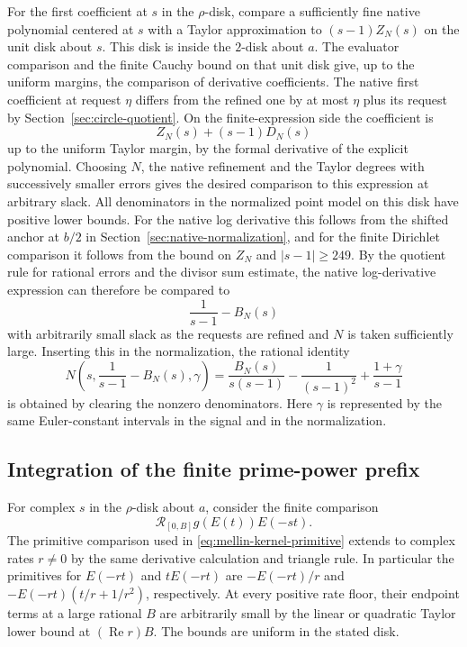 \documentclass[11pt]{amsart}
\theoremstyle{definition}
\theoremstyle{remark}
\numberwithin{equation}{section}
\newcommand{\re}{\operatorname{Re}}
\begin{document}
For the first coefficient at \(s\) in the \(\rho\)-disk,
compare a sufficiently fine native polynomial centered
at \(s\) with a Taylor approximation to
\((s-1)Z_N(s)\) on the unit disk about \(s\).
This disk is inside the \(2\)-disk about \(a\).
The evaluator comparison and the finite Cauchy bound on
that unit disk give, up to the uniform margins, the
comparison of derivative coefficients.
The native first coefficient at request \(\eta\) differs
from the refined one by at most \(\eta\) plus its request
by Section~\ref{sec:circle-quotient}.
On the finite-expression side the coefficient is
\[
                        Z_N(s)+(s-1)D_N(s)
\]
up to the uniform Taylor margin, by the formal derivative
of the explicit polynomial.
Choosing \(N\), the native refinement and the Taylor degrees
with successively smaller errors gives the desired comparison
to this expression at arbitrary slack. All denominators
in the normalized point model on this disk have positive
lower bounds. For the native log derivative this follows
from the shifted anchor at \(b/2\) in
Section~\ref{sec:native-normalization}, and for the finite
Dirichlet comparison it follows from the bound on \(Z_N\)
and \(|s-1|\ge249\).
By the quotient rule for rational errors and the divisor sum
estimate, the native log-derivative expression can therefore
be compared to
\[
                          \frac1{s-1}-B_N(s)
\]
with arbitrarily small slack as the requests are refined
and \(N\) is taken sufficiently large.
Inserting this in the normalization, the rational identity
\begin{equation}\label{eq:dirichlet-normalized}
  N\!\left(s,\frac1{s-1}-B_N(s),\gamma\right)
      =\frac{B_N(s)}{s(s-1)}
                    -\frac1{(s-1)^2}+\frac{1+\gamma}{s-1}
\end{equation}
is obtained by clearing the nonzero denominators. Here
\(\gamma\) is represented by the same Euler-constant
intervals in the signal and in the normalization.

\subsection{Integration of the finite prime-power prefix}
\label{sec:mellin-ramp-integration}

For complex \(s\) in the \(\rho\)-disk about \(a\),
consider the finite comparison
\[
                       \mathcal R_{[0,B]} g(E(t))E(-st).
\]
The primitive comparison used in
\eqref{eq:mellin-kernel-primitive} extends to complex rates
\(r\ne0\) by the same derivative calculation and triangle
rule. In particular the primitives for \(E(-rt)\) and
\(tE(-rt)\) are \(-E(-rt)/r\) and
\(-E(-rt)(t/r+1/r^2)\), respectively.
At every positive rate floor, their endpoint terms at a
large rational \(B\) are arbitrarily small by the linear
or quadratic Taylor lower bound at \((\re r)B\).
The bounds are uniform in the stated disk.
\end{document}
